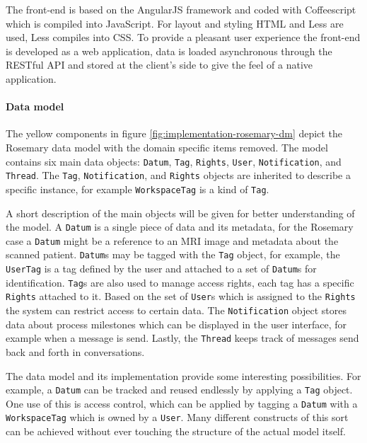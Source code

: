 The front-end is based on the AngularJS \cite{angular} framework and coded with Coffeescript \cite{coffeescript} which is compiled into JavaScript.
For layout and styling HTML and Less \cite{less} are used, Less compiles into CSS.
To provide a pleasant user experience the front-end is developed as a web application, data is loaded asynchronous through the RESTful API and stored at the client's side to give the feel of a native application.


\paragraph{Data model}
The yellow components in figure \ref{fig:implementation-rosemary-dm} depict the Rosemary data model with the domain specific items removed.
The model contains six main data objects: {\tt Datum}, {\tt Tag}, {\tt Rights}, {\tt User}, {\tt Notification}, and {\tt Thread}.
The {\tt Tag}, {\tt Notification}, and {\tt Rights} objects are inherited to describe a specific instance, for example {\tt WorkspaceTag} is a kind of {\tt Tag}.

A short description of the main objects will be given for better understanding of the model.
A {\tt Datum} is a single piece of data and its metadata, for the Rosemary case a {\tt Datum} might be a reference to an MRI image and metadata about the scanned patient.
{\tt Datum}s may be tagged with the {\tt Tag} object, for example, the {\tt UserTag} is a tag defined by the user and attached to a set of {\tt Datum}s for identification.
{\tt Tag}s are also used to manage access rights, each tag has a specific {\tt Rights} attached to it.
Based on the set of {\tt User}s which is assigned to the {\tt Rights} the system can restrict access to certain data.
The {\tt Notification} object stores data about process milestones which can be displayed in the user interface, for example when a message is send.
Lastly, the {\tt Thread} keeps track of messages send back and forth in conversations.

The data model and its implementation provide some interesting possibilities.
For example, a {\tt Datum} can be tracked and reused endlessly by applying a {\tt Tag} object.
One use of this is access control, which can be applied by tagging a {\tt Datum} with a {\tt WorkspaceTag} which is owned by a {\tt User}.
Many different constructs of this sort can be achieved without ever touching the structure of the actual model itself.

